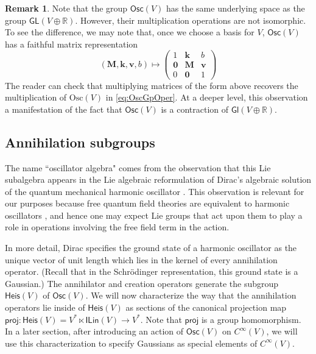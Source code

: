 \documentclass[12pt]{article}
\newcounter{counter}
\theoremstyle{definition}
\newtheorem{rmk}[counter]{Remark}
\theoremstyle{plain}
\begin{document}
\begin{rmk}
 Note that the group \(\mathsf{Osc}(V)\) has the same underlying space as the group \(\mathsf{GL}(V \oplus \mathbb{R})\).  However, their multiplication operations are not isomorphic.  To see the difference,
 we may note that, once we choose a basis for \(V\), \(\mathsf{Osc}(V)\) has a faithful matrix representation
 \begin{equation}
     (\mathbf{M}, \mathbf{k}, \mathbf{v}, b) \mapsto
     \begin{pmatrix}
         1 & \mathbf{k} & b \\
         \boldsymbol{0} & \mathbf{M} & \mathbf{v} \\
         0 & \boldsymbol{0} & 1
     \end{pmatrix}
 \end{equation}
The reader can check that multiplying matrices of the form above recovers the multiplication of $\mathrm{Osc}(V)$ in \autoref{eq:OscGpOper}.
At a deeper level, this observation a manifestation of  the fact that \(\mathsf{Osc}(V)\) is a contraction of \(\mathsf{Gl}(V \oplus \mathbb{R})\). \cite{gilmore2006lie}
\end{rmk}

\subsection{Annihilation subgroups}
 
The name ``oscillator algebra" comes from the observation that this Lie subalgebra appears in the Lie algebraic reformulation of Dirac's algebraic solution of the quantum mechanical harmonic oscillator \cite{dirac1981principles, gilmore2006lie}. This observation is relevant for our purposes because free quantum field theories are equivalent to harmonic oscillators \cite{zee2010quantum}, and hence one may expect Lie groups that act upon them to play a role in operations involving the free field term in the action.

In more detail, Dirac specifies the ground state of a harmonic oscillator as the unique vector of unit length which lies in the kernel of every annihilation operator.  (Recall that in the Schr\"odinger representation, this ground state is a Gaussian.)  The annihilator and creation operators generate the subgroup \(\mathsf{Heis}(V)\) of \(\mathsf{Osc}(V)\).  We will now characterize the way that the annihilation operators lie inside of \(\mathsf{Heis}(V)\) as sections of the canonical projection map $\mathsf{proj}:\mathsf{Heis}(V)=V^*\ltimes\mathsf{ILin}(V)\to V^*$. Note that $\mathsf{proj}$ is a group homomorphism. In a later section, after introducing an action of \(\mathsf{Osc}(V)\) on \(C^{\infty}(V)\), we will use this characterization to specify Gaussians as special elements of \(C^{\infty}(V)\).\\
\end{document}
